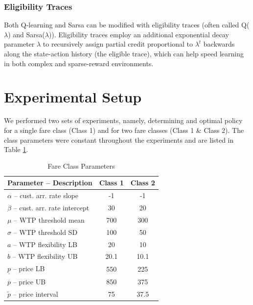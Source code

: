 \documentclass[letterpaper]{article}%
\begin{document}
\subsubsection{Eligibility Traces} 

Both Q-learning and Sarsa can be modified with eligibility traces (often called Q($\lambda$) and Sarsa($\lambda$)). Eligibility traces employ an additional exponential decay parameter $\lambda$ to recursively assign partial credit proportional to $\lambda^t$ backwards along the state-action history (the eligible trace), which can help speed learning in both complex and sparse-reward environments.

\section{Experimental Setup}

We performed two sets of experiments, namely, determining and optimal policy for a single fare class (Class 1) and for two fare classes (Class 1 \& Class 2). The class parameters were constant throughout the experiments and are listed in Table \ref{tab:fare-class-params}.

\begin{table}[h!]
 \caption{Fare Class Parameters}
    \vspace{10 pt}
    \label{tab:fare-class-params}
    \centering
    \begin{tabular}{l|cc}
        \hline \hline
        \textbf{Parameter -- Description} & \textbf{Class 1} & \textbf{Class 2}  \\ \hline
        $\alpha$ -- cust. arr. rate slope    & -1 & -1 \\
        $\beta$ -- cust. arr. rate intercept & 30 & 20 \\
        $\mu$ -- WTP threshold mean          & 700 & 300  \\
        $\sigma$ -- WTP threshold SD         & 100 & 50 \\
        $a$ -- WTP flexibility LB            & 20 & 10 \\ 
        $b$ -- WTP flexibility UB            & 20.1 & 10.1  \\
        $\underline{p}$ -- price LB          & 550 & 225   \\
        $\overline{p}$ -- price UB           & 850 & 375  \\
        $\tilde{p}$ -- price interval        & 75 & 37.5  \\
        \hline \hline
    \end{tabular}
\end{table}
\end{document}

